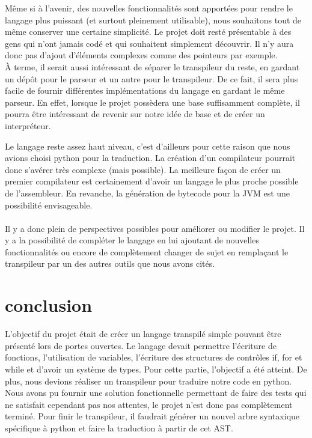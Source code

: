 \documentclass[a4paper]{article}%
\begin{document}
Même si à l'avenir, des nouvelles fonctionnalités sont apportées pour rendre le
langage plus puissant (et surtout pleinement utilisable), nous souhaitons tout
de même conserver une certaine simplicité. Le projet doit resté présentable à
des gens qui n'ont jamais codé et qui souhaitent simplement découvrir. Il n'y
aura donc pas d'ajout d'éléments complexes comme des pointeurs par exemple.\\

À terme, il serait aussi intéressant de séparer le transpileur du reste, en
gardant un dépôt pour le parseur et un autre pour le transpileur. De ce fait, il
sera plus facile de fournir différentes implémentations du langage en gardant
le même parseur. En effet, lorsque le projet possèdera une base suffisamment
complète, il pourra être intéressant de revenir sur notre idée de base et de
créer un interpréteur.

Le langage reste assez haut niveau, c'est d'ailleurs pour cette raison que nous
avions choisi python pour la traduction. La création d'un compilateur pourrait
donc s'avérer très complexe (mais possible). La meilleure façon de créer un
premier compilateur est certainement d'avoir un langage le plus proche possible
de l'assembleur. En revanche, la génération de bytecode pour la JVM est une
possibilité envisageable.\\~\\

Il y a donc plein de perspectives possibles pour améliorer ou modifier le
projet. Il y a la possibilité de compléter le langage en lui ajoutant de
nouvelles fonctionnalités ou encore de complètement changer de sujet en
remplaçant le transpileur par un des autres outils que nous avons cités.

\clearpage
\section*{conclusion}
\large

L'objectif du projet était de créer un langage transpilé simple pouvant être
présenté lors de portes ouvertes. Le langage devait permettre l'écriture de
fonctions, l'utilisation de variables, l'écriture des structures de contrôles
if, for et while et d'avoir un système de types. Pour cette partie, l'objectif a
été atteint. De plus, nous devions réaliser un transpileur pour traduire notre
code en python. Nous avons pu fournir une solution fonctionnelle permettant de
faire des tests qui ne satisfait cependant pas nos attentes, le projet n'est
donc pas complètement terminé. Pour finir le transpileur, il faudrait générer un
nouvel arbre syntaxique spécifique à python et faire la traduction à partir de
cet AST.\\
\end{document}
